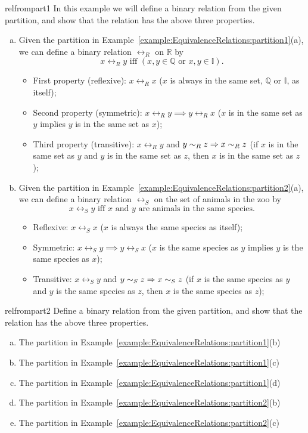 \begin{example}{relfrompart1}
In this example we will define a binary relation from the given partition, and show that the relation has the above three properties.
\begin{enumerate}[(a)]
\item Given the partition in Example~\ref{example:EquivalenceRelations:partition1}(a), we can define a binary relation $\rel_R$ on $\mathbb{R}$ by 
\[x \rel_R y  \text{   iff   }  (x,y \in \mathbb{Q} \text{ or }x,y \in \mathbb{I}).\]

\begin{itemize}
\item  First property (reflexive): $x \rel_R x$ ($x$ is always in the same set, $\mathbb{Q}$ or $\mathbb{I}$, as itself);
\item  Second property (symmetric): $x \rel_R y \implies y \rel_R x$ ($x$ is in the same set as $y$ implies $y$ is in the same set as $x$);
\item  Third property (transitive): $x \rel_R y$ and $y \sim_R z \Rightarrow x \sim_R z$ (if $x$ is in the same set as $y$ and $y$ is in the same set as $z$, then $x$ is in the same set as $z$);
\end{itemize}

\item Given the partition in Example~\ref{example:EquivalenceRelations:partition2}(a), we can define a binary relation $\rel_S$ on the set of animals in the zoo by 
\[x \rel_S y  \text{   iff   }  x \text{ and } y \text{ are animals in the same species} .\]
\begin{itemize}
\item  Reflexive: $x \rel_S x$ ($x$ is always the same species as itself);
\item  Symmetric: $x \rel_S y \implies y \rel_S x$ ($x$ is the same species as $y$ implies $y$ is the same species as $x$);
\item  Transitive: $x \rel_S y$ and $y \sim_S z \Rightarrow x \sim_S z$ (if $x$ is the same species as $y$ and $y$ is the same species as $z$, then $x$ is the same species as $z$);
\end{itemize}
\end{enumerate}
\end{example}

\begin{exercise}{relfrompart2}
Define a binary relation from the given partition, and show that the relation has the above three properties.
\begin{enumerate}[(a)]
\item The partition in Example~\ref{example:EquivalenceRelations:partition1}(b)
\item The partition in Example~\ref{example:EquivalenceRelations:partition1}(c)
\item The partition in Example~\ref{example:EquivalenceRelations:partition1}(d)
\item The partition in Example~\ref{example:EquivalenceRelations:partition2}(b)
\item The partition in Example~\ref{example:EquivalenceRelations:partition2}(c)
\end{enumerate}
\end{exercise}

